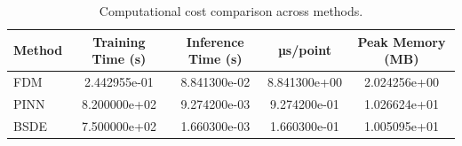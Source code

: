 \begin{table}[ht]
\centering
\caption{Computational cost comparison across methods.}
\label{tab:computational_cost}
\begin{tabular}{lcccc}
\toprule
Method & Training Time (s) & Inference Time (s) & µs/point & Peak Memory (MB) \\
\midrule
FDM & 2.442955e-01 & 8.841300e-02 & 8.841300e+00 & 2.024256e+00 \\
PINN & 8.200000e+02 & 9.274200e-03 & 9.274200e-01 & 1.026624e+01 \\
BSDE & 7.500000e+02 & 1.660300e-03 & 1.660300e-01 & 1.005095e+01 \\
\bottomrule
\end{tabular}
\end{table}